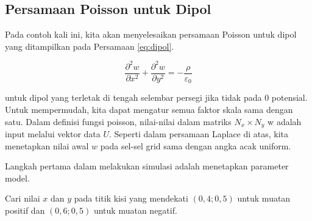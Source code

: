 \documentclass[
]{book}
\newenvironment{Shaded}{\begin{snugshade}}{\end{snugshade}}
\newcommand{\AttributeTok}[1]{\textcolor[rgb]{0.13,0.29,0.53}{#1}}
\newcommand{\DecValTok}[1]{\textcolor[rgb]{0.00,0.00,0.81}{#1}}
\newcommand{\FunctionTok}[1]{\textcolor[rgb]{0.13,0.29,0.53}{\textbf{#1}}}
\newcommand{\NormalTok}[1]{#1}
\newcommand{\OtherTok}[1]{\textcolor[rgb]{0.56,0.35,0.01}{#1}}
\newcommand{\SpecialCharTok}[1]{\textcolor[rgb]{0.81,0.36,0.00}{\textbf{#1}}}
\theoremstyle{definition}
\theoremstyle{definition}
\theoremstyle{definition}
\theoremstyle{definition}
\theoremstyle{remark}
\begin{document}
\hypertarget{persamaan-poisson-untuk-dipol}{%
\subsection{Persamaan Poisson untuk Dipol}\label{persamaan-poisson-untuk-dipol}}

Pada contoh kali ini, kita akan menyelesaikan persamaan Poisson untuk dipol yang ditampilkan pada Persamaan \eqref{eq:dipol}.

\begin{equation}
\frac{\partial^2w}{\partial x^2}+\frac{\partial^2w}{\partial y^2}=-\frac{\rho}{\varepsilon_0}
  \label{eq:dipol}
\end{equation}

untuk dipol yang terletak di tengah selembar persegi jika tidak pada 0 potensial. Untuk mempermudah, kita dapat mengatur semua faktor skala sama dengan satu. Dalam definisi fungsi poisson, nilai-nilai dalam matriks \(N_x \times N_y\) w adalah input melalui vektor data \(U\). Seperti dalam persamaan Laplace di atas, kita menetapkan nilai awal \(w\) pada sel-sel grid sama dengan angka acak uniform.

Langkah pertama dalam melakukan simulasi adalah menetapkan parameter model.

\begin{Shaded}
\end{Shaded}

Cari nilai \(x\) dan \(y\) pada titik kisi yang mendekati \(\left(0,4;0,5\right)\) untuk muatan positif dan \(\left(0,6;0,5\right)\) untuk muatan negatif.
\end{document}
